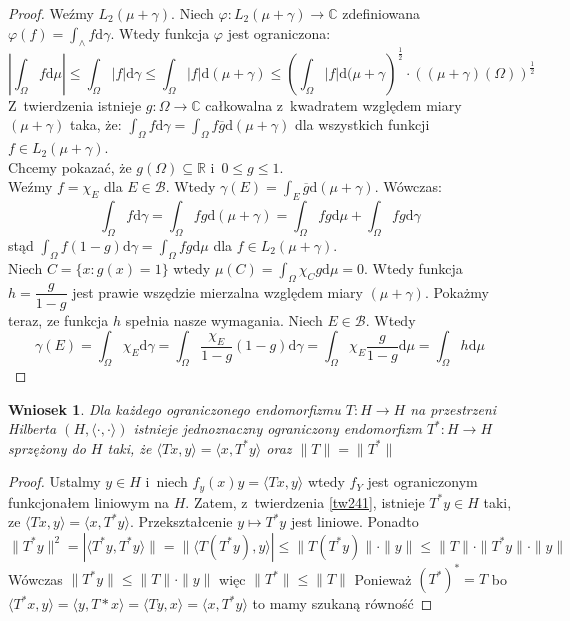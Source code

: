 \documentclass[11pt]{mwrep}
\renewcommand{\[}{\begin{equation}}
\renewcommand{\]}{\end{equation}}
\newcommand{\C}{{\ensuremath{\mathbb C}}}
\newcommand{\R}{{\ensuremath{\mathbb R}}}
\newcommand{\dd}{\mathrm{d}}
\newcommand{\scal}{\langle \cdot,\cdot \rangle}
\newtheorem{wn}[subsection]{Wniosek}
\begin{document}
\begin{proof}
	Weźmy $L_2(\mu+\gamma)$. Niech $\varphi\colon L_2(\mu+\gamma) \to \C$  zdefiniowana $\varphi(f) = \int_\wedge f \dd \gamma$.
	Wtedy funkcja $\varphi$ jest ograniczona: 
	$$\left| \int_\Omega f \dd \mu\right| \le \int_\Omega |f| \dd \gamma\le \int_\Omega|f|\dd(\mu+\gamma) \le 
	\left( \int_\Omega |f| \dd(\mu+\gamma \right)^\frac{1}{2}\cdot \left( (\mu+\gamma)(\Omega) \right)^\frac{1}{2} $$
	Z~twierdzenia istnieje $g\colon \Omega \to \C$ całkowalna z~kwadratem względem miary $(\mu+\gamma)$ taka, że: 
	$ \int_\Omega f \dd \gamma = \int_\Omega f \overline{g} \dd (\mu+\gamma)$ dla wszystkich funkcji $f \in L_2(\mu+\gamma)$.\\
	Chcemy pokazać, że $g(\Omega) \subseteq \R$ i~$0\le g\le 1$.\\
	Weźmy $f = \chi_E$ dla $E\in \mathcal{B}$. Wtedy $ \gamma(E) = \int_E \overline{g} \dd(\mu+\gamma)$. 
	Wówczas:
	$$\int_\Omega f \dd \gamma = \int_\Omega f g \dd (\mu+ \gamma) = \int_\Omega fg \dd \mu + \int_\Omega fg \dd \gamma$$
	stąd $\int_\Omega f (1-g) \dd \gamma = \int_\Omega fg \dd \mu $ dla $f \in L_2(\mu+\gamma)$.\\
	Niech $C= \{x: g(x) = 1\}$ wtedy $\mu(C) = \int_\Omega \chi_C g \dd \mu =0$.
	Wtedy funkcja $h = \dfrac{g}{1-g}$ jest prawie wszędzie mierzalna względem miary $(\mu+\gamma)$. Pokażmy teraz, ze funkcja $h$ spełnia nasze wymagania.
	Niech $E \in \mathcal{B}$. Wtedy 
	$$\gamma(E) = \int_\Omega \chi_E \dd \gamma = \int_\Omega\frac{\chi_E}{1-g}(1-g)\dd \gamma = \int_\Omega \chi_E \frac{g}{1-g}\dd \mu = 
	\int_\Omega h \dd \mu$$ %
\end{proof}
\begin{wn}
	Dla każdego ograniczonego endomorfizmu $T\colon H\to H$ na przestrzeni Hilberta $(H, \scal)$ istnieje jednoznaczny ograniczony endomorfizm 
	$T^*\colon H\to H$ sprzężony do $H$ taki, że $\langle T x ,y  \rangle = \langle x, T^* y \rangle$ oraz $\|T\| = \|T^*\|$
\end{wn}
\begin{proof}
	Ustalmy $y \in H$ i~niech $f_y(x)y = \langle Tx ,y \rangle$ wtedy $f_Y$ jest ograniczonym funkcjonałem liniowym na $H$. 
	Zatem, z~twierdzenia \ref{tw241}, istnieje $T^*y \in H$ taki, ze $\langle Tx ,y  \rangle=\langle x, T^* y  \rangle$. 
	Przekształcenie $y \mapsto T^*y $ jest liniowe. 
	Ponadto 
	$$\|T^* y\|^2 = |\langle T^* y, T^* y \rangle \| = \|\langle T(T^* y), y \rangle| \le 
	\|T(T^*y)\|\cdot \|y\|\le \|T\| \cdot \|T^* y\| \cdot \|y\|$$
	Wówczas $\|T^* y \| \le \|T\|\cdot \|y\|$ więc $\|T^*\|\le\|T\|$
	Ponieważ $(T^*)^* = T$ bo $\langle T^*x,y  \rangle = \langle y, T*x \rangle = \langle T y , x \rangle = \langle x, T^* y \rangle$
	to mamy szukaną równość

\end{proof}
\end{document}
